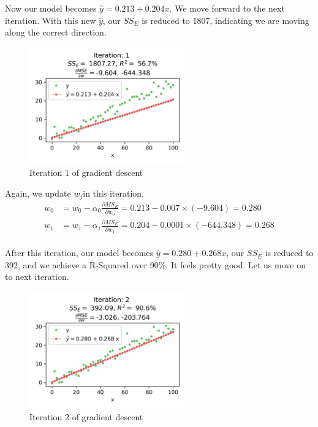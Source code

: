 \documentclass[
	letterpaper
]{article}
\begin{document}
Now our model becomes $\hat y = 0.213 + 0.204 x$.
We move forward to the next iteration. 
With this new $\hat y$, our $SS_E$ is reduced to 1807, indicating we are moving along the correct direction.
\begin{figure}[htbp]
	\centering
	\includegraphics[width=0.6\textwidth]{figures/visualize-1.png}
	\caption{Iteration 1 of gradient descent}
	\label{fig:vis1}
\end{figure}

Again, we update $w_j$in this iteration.
\begin{equation}
\begin{split}
w_0 &= w_0 - \alpha_0 \frac{\partial MS_E}{\partial w_0} = 0.213 - 0.007\times (-9.604) = 0.280\\
w_1 &= w_1 - \alpha_ 1 \frac{\partial MS_E}{\partial w_1} = 0.204 - 0.0001\times (-644.348)=0.268 \\
\end{split}
\end{equation}

After this iteration, our model becomes $\hat y = 0.280 + 0.268 x$, our $SS_E$ is reduced to 392, and we achieve a R-Squared over 90\%.
It feels pretty good.
Let us move on to next iteration.
\begin{figure}[htbp]
	\centering
	\includegraphics[width=0.6\textwidth]{figures/visualize-2.png}
	\caption{Iteration 2 of gradient descent}
	\label{fig:vis2}
\end{figure}
\end{document}

